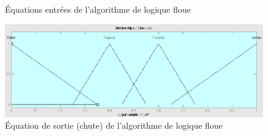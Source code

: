 \documentclass[12pt,letterpaper]{article}
\begin{document}
\begin{figure}
    \centering
    \quad


    \caption{Équations entrées de l'algorithme de logique floue}
    \label{fig:f_input}
\end{figure}

\begin{figure}
\centering
\includegraphics[scale=0.2]{images/f_chute.png}
\caption{Équation de sortie (chute) de l'algorithme de logique floue}
\label{fig:f_output}
\end{figure}
\end{document}
